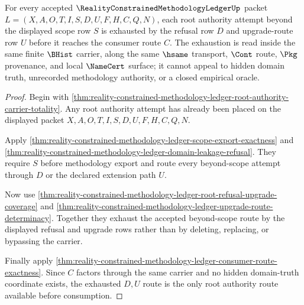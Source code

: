 \begin{theorem}
\label{thm:reality-constrained-methodology-ledger-scope-refusal-upgrade-route-exhaustion}
For every accepted $\RealityConstrainedMethodologyLedgerUp$ packet $L=(X,A,O,T,I,S,D,U,F,H,C,Q,N)$, each root authority attempt beyond the displayed scope row $S$ is exhausted by the refusal row $D$ and upgrade-route row $U$ before it reaches the consumer route $C$. The exhaustion is read inside the same finite $\BHist$ carrier, along the same $\hsame$ transport, $\Cont$ route, $\Pkg$ provenance, and local $\NameCert$ surface; it cannot appeal to hidden domain truth, unrecorded methodology authority, or a closed empirical oracle.
\end{theorem}
\begin{proof}
Begin with \autoref{thm:reality-constrained-methodology-ledger-root-authority-carrier-totality}. Any root authority attempt has already been placed on the displayed packet $X,A,O,T,I,S,D,U,F,H,C,Q,N$.

Apply \autoref{thm:reality-constrained-methodology-ledger-scope-export-exactness} and \autoref{thm:reality-constrained-methodology-ledger-domain-leakage-refusal}. They require $S$ before methodology export and route every beyond-scope attempt through $D$ or the declared extension path $U$.

Now use \autoref{thm:reality-constrained-methodology-ledger-root-refusal-upgrade-coverage} and \autoref{thm:reality-constrained-methodology-ledger-upgrade-route-determinacy}. Together they exhaust the accepted beyond-scope route by the displayed refusal and upgrade rows rather than by deleting, replacing, or bypassing the carrier.

Finally apply \autoref{thm:reality-constrained-methodology-ledger-consumer-route-exactness}. Since $C$ factors through the same carrier and no hidden domain-truth coordinate exists, the exhausted $D,U$ route is the only root authority route available before consumption.
\end{proof}

